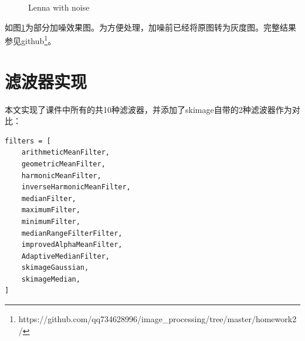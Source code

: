 \documentclass{article}
\begin{document}
\begin{figure}[ht]
	\centering
	\quad
	\caption{Lenna with noise}
	\label{fig:noise}
\end{figure}

如图\ref{fig:noise}为部分加噪效果图。为方便处理，加噪前已经将原图转为灰度图。完整结果参见github\footnote{https://github.com/qq734628996/image\_processing/tree/master/homework2/}。

\section{滤波器实现}

本文实现了课件中所有的共10种滤波器，并添加了skimage自带的2种滤波器作为对比：

\begin{lstlisting}[title={12种滤波器对应函数名}]
filters = [
	arithmeticMeanFilter,
	geometricMeanFilter,
	harmonicMeanFilter,
	inverseHarmonicMeanFilter,
	medianFilter,
	maximumFilter,
	minimumFilter,
	medianRangeFilterFilter,
	improvedAlphaMeanFilter,
	AdaptiveMedianFilter,
	skimageGaussian,
	skimageMedian,
]
\end{lstlisting}
\end{document}
